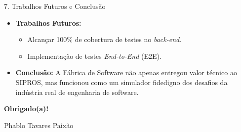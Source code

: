 \documentclass[aspectratio=169]{beamer}
\begin{document}
\begin{frame}{7. Trabalhos Futuros e Conclusão}
  \begin{itemize}
    \setlength\itemsep{1em}
    \item \textbf{Trabalhos Futuros:}
    \begin{itemize}
        \item Alcançar 100\% de cobertura de testes no \textit{back-end}.
        \item Implementação de testes \textit{End-to-End} (E2E).
    \end{itemize}
    \vspace{0.5em}
    \item \textbf{Conclusão:} A Fábrica de Software não apenas entregou valor técnico ao SIPROS, mas funcionou como um simulador fidedigno dos desafios da indústria real de engenharia de software.
  \end{itemize}
\end{frame}

\begin{frame}[plain, c]
  \begin{center}
    \Huge \textbf{Obrigado(a)!}
    
    \vspace{1em}
    \Large Phablo Tavares Paixão
  \end{center}
\end{frame}
\end{document}

